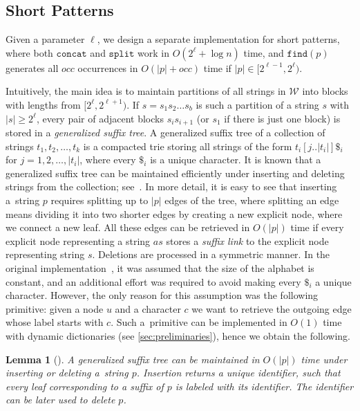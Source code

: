 \documentclass[a4paper]{article}
\newtheorem{lemma}[theorem]{Lemma}
\theoremstyle{remark}
\newcommand{\concop}{\mathtt{concat}}
\newcommand{\splitop}{\mathtt{split}}
\newcommand{\findop}{\mathtt{find}}
\newcommand{\coll}{\mathcal{W}}
\begin{document}
\subsection{Short Patterns}\label{sec:short}

Given a parameter $\ell$, we design a separate implementation for short patterns, where
both $\concop$ and $\splitop$ work in $O(2^\ell+\log n)$ time, and $\findop(p)$ generates
all $occ$ occurrences in $O(|p|+occ)$ time if $|p|\in [2^{\ell-1},2^{\ell})$.

Intuitively, the main idea is to maintain partitions of all strings in $\coll$ into blocks with lengths from $[2^\ell,2^{\ell+1})$. If $s=s_1 s_2 \ldots s_b$ is such
a partition of a string $s$ with $|s| \geq 2^{\ell}$, every pair of adjacent blocks $s_i s_{i+1}$ (or $s_1$ if there is just one block) is stored in a \emph{generalized suffix tree}.
A generalized suffix tree of a collection of strings
$t_1,t_2,\ldots,t_k$ is a compacted trie storing all strings of the form $t_i[j..|t_i|] \$_i$ for $j=1,2,\ldots,|t_i|$, where
every $ \$_i$ is a unique character. It is known that a generalized suffix tree can be maintained
efficiently under inserting and deleting strings from the collection; see~\cite{dictionary}.
In more detail, it is easy to see that inserting a~string $p$ requires splitting up to $|p|$ edges of the tree, where
splitting an edge means dividing it into two shorter edges by creating a new explicit node,
where we connect a new leaf. All these edges can be retrieved in $O(|p|)$ time if every explicit
node representing a string $as$ stores a \emph{suffix link} to the explicit node representing string $s$.
Deletions are processed in a symmetric manner.
In the original implementation~\cite{dictionary}, it was assumed that the size of the alphabet is constant, and
an additional effort was required to avoid making every $ \$_i$ a unique character. However,
the only reason for this assumption was the following primitive: given a node
$u$ and a character $c$ we want to retrieve the outgoing edge whose label starts with $c$. Such
a~primitive can be implemented in $O(1)$ time with dynamic dictionaries (see \cref{sec:preliminaries}),
hence we obtain the following.

\begin{lemma}[\cite{dictionary}]
\label{lem:GST}
A generalized suffix tree can be maintained in $O(|p|)$ time under inserting or deleting a~string
$p$. Insertion returns a unique identifier, such that every leaf corresponding to a suffix of $p$
is labeled with its identifier. The identifier can be later used to delete $p$.
\end{lemma}
\end{document}
